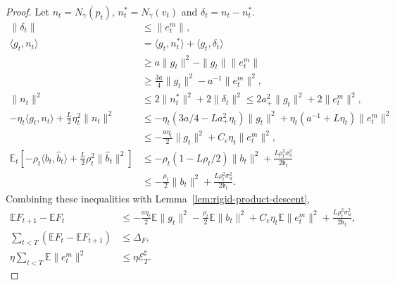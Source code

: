 \begin{proof}
Let $n_t=N_\gamma(p_t)$, $n_t^*=N_\gamma(v_t)$ and $\delta_t=n_t-n_t^*$.
\begin{align}
 \|\delta_t\|&\le\|e_{t}^{m}\|,\\
 \langle g_t,n_t\rangle
 &=\langle g_t,n_t^*\rangle+\langle g_t,\delta_t\rangle\\
 &\ge a\|g_t\|^2-\|g_t\|\|e_{t}^{m}\|\\
 &\ge\tfrac{3a}{4}\|g_t\|^2-a^{-1}\|e_{t}^{m}\|^2,\\
 \|n_t\|^2&\le2\|n_t^*\|^2+2\|\delta_t\|^2
 \le2a_+^2\|g_t\|^2+2\|e_{t}^{m}\|^2,\\
 -\eta_t\langle g_t,n_t\rangle+\tfrac L2\eta_t^2\|n_t\|^2
 &\le-\eta_t(3a/4-La_+^2\eta_t)\|g_t\|^2
 +\eta_t(a^{-1}+L\eta_t)\|e_{t}^{m}\|^2\\
 &\le-\tfrac{a\eta_t}{2}\|g_t\|^2+C_e\eta_t\|e_{t}^{m}\|^2,
 \label{eq:normalized-descent}\\
 \mathbb E_t[-\rho_t\langle b_t,\widehat b_t\rangle+
 \tfrac L2\rho_t^2\|\widehat b_t\|^2]
 &\le-\rho_t(1-L\rho_t/2)\|b_t\|^2+
 \frac{L\rho_t^2\sigma_u^2}{2\mathfrak b_t}\\
 &\le-\tfrac{\rho_t}{2}\|b_t\|^2+
 \frac{L\rho_t^2\sigma_u^2}{2\mathfrak b_t}.
\end{align}
Combining these inequalities with Lemma~\ref{lem:rigid-product-descent},
\begin{align}
 \mathbb EF_{t+1}-\mathbb EF_t
 &\le-\tfrac{a\eta_t}{2}\mathbb E\|g_t\|^2-
 \tfrac{\rho_t}{2}\mathbb E\|b_t\|^2+C_e\eta_t\mathbb E\|e_{t}^{m}\|^2
 +\frac{L\rho_t^2\sigma_u^2}{2\mathfrak b_t},\\
 \sum_{t<T}(\mathbb EF_t-\mathbb EF_{t+1})&\le\Delta_F,\\
 \eta\sum_{t<T}\mathbb E\|e_{t}^{m}\|^2&\le\eta\mathscr E_T^\sharp.
\end{align}
\end{proof}

